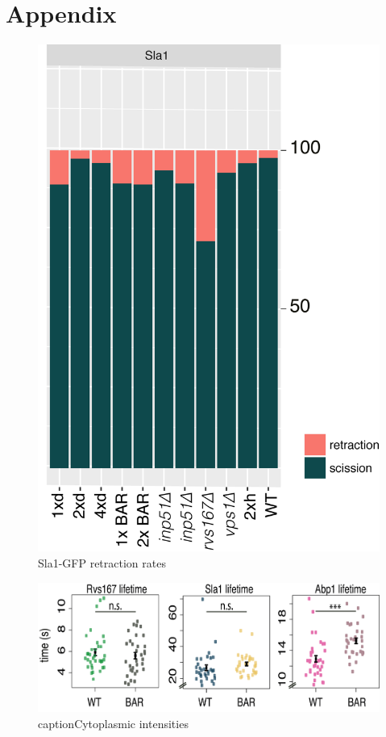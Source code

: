\chapter*{Appendix} %
\label{Ch:Appendix}

\begin{figure}[H]
\includegraphics[scale=1.5]{figures/appendix/retraction_rates_all}
\caption{Sla1-GFP retraction rates}
\end{figure}


\begin{figure}[H]
	\includegraphics[scale=1.5]{figures/appendix/delsh3_5}
	caption{Cytoplasmic intensities}
\end{figure}